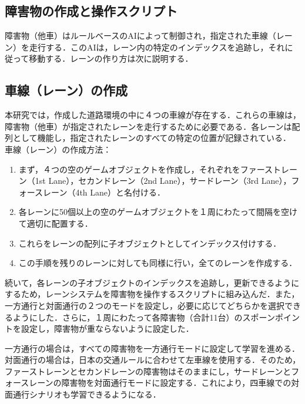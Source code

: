 \subsection{障害物の作成と操作スクリプト}
障害物（他車）はルールベースのAIによって制御され，指定された車線（レーン）を走行する．このAIは，レーン内の特定のインデックスを追跡し，それに従って移動する．レーンの作り方は次に説明する．

\subsection{車線（レーン）の作成}
本研究では，作成した道路環境の中に４つの車線が存在する．これらの車線は，障害物（他車）が指定されたレーンを走行するために必要である．各レーンは配列として機能し，指定されたレーンのすべての特定の位置が記録されている．\\

\noindent 車線（レーン）の作成方法：
\begin{enumerate}
  \item まず，４つの空のゲームオブジェクトを作成し，それぞれをファーストレーン（1st Lane），セカンドレーン（2nd Lane），サードレーン（3rd Lane），フォースレーン（4th Lane）と名付ける．
  \item 各レーンに50個以上の空のゲームオブジェクトを１周にわたって間隔を空けて適切に配置する．
  \item これらをレーンの配列に子オブジェクトとしてインデックス付けする．
  \item この手順を残りのレーンに対しても同様に行い，全てのレーンを作成する．
\end{enumerate}

続いて，各レーンの子オブジェクトのインデックスを追跡し，更新できるようにするため，レーンシステムを障害物を操作するスクリプトに組み込んだ．また，一方通行と対面通行の２つのモードを設定し，必要に応じてどちらかを選択できるようにした．さらに，１周にわたって各障害物（合計11台）のスポーンポイントを設定し，障害物が重ならないように設定した．

一方通行の場合は，すべての障害物を一方通行モードに設定して学習を進める．対面通行の場合は，日本の交通ルールに合わせて左車線を使用する．そのため，ファーストレーンとセカンドレーンの障害物はそのままにし，サードレーンとフォースレーンの障害物を対面通行モードに設定する．これにより，四車線での対面通行シナリオも学習できるようになる．


